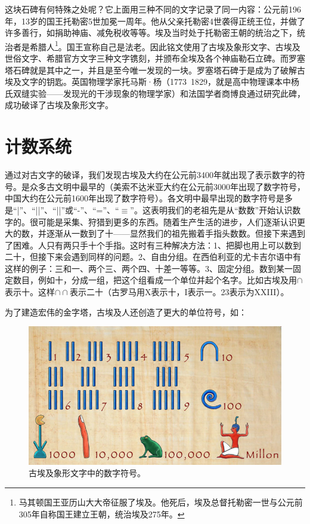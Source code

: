 \documentclass[b5paper]{ctexart}
\begin{document}
这块石碑有何特殊之处呢？它上面用三种不同的文字记录了同一内容：公元前196年，13岁的国王托勒密5世加冕一周年。他从父亲托勒密4世袭得正统王位，并做了许多善行，如捐助神庙、减免税收等等。埃及当时处于托勒密王朝的统治之下，统治者是希腊人\footnote{马其顿国王亚历山大大帝征服了埃及。他死后，埃及总督托勒密一世与公元前305年自称国王建立王朝，统治埃及275年。}。国王宣称自己是法老。因此铭文使用了古埃及象形文字、古埃及世俗文字、希腊官方文字三种文字镌刻，并颁布全埃及各个神庙勒石立碑。而罗塞塔石碑就是其中之一，并且是至今唯一发现的一块。罗塞塔石碑于是成为了破解古埃及文字的钥匙。英国物理学家托马斯·杨（1773~1829，就是高中物理课本中杨氏双缝实验——发现光的干涉现象的物理学家）和法国学者商博良通过研究此碑，成功破译了古埃及象形文字。

\section{计数系统}

通过对古文字的破译，我们发现古埃及大约在公元前3400年就出现了表示数字的符号。是众多古文明中最早的（美索不达米亚大约在公元前3000年出现了数字符号，中国大约在公元前1600年出现了数字符号）。各文明中最早出现的数字符号是多是“|”、“||”、“||”或“-”、“=”、“$\equiv$”。这表明我们的老祖先是从“数数”开始认识数字的。很可能是采集、狩猎到更多的东西。随着生产生活的进步，人们逐渐认识更大的数，并逐渐从一数到了十——显然我们的祖先搬着手指头数数。但接下来遇到了困难。人只有两只手十个手指。这时有三种解决方法：1、把脚也用上可以数到二十，但接下来会遇到同样的问题。2、自由分组。在西伯利亚的尤卡吉尔语中有这样的例子：三和一、两个三、两个四、十差一等等。3、固定分组。数到某一固定数目，例如十，分成一组，把这个组看成一个单位并起个名字。比如古埃及用$\cap$表示十。这样$\cap \cap$表示二十（古罗马用X表示十，I表示一。23表示为XXIII）。

为了建造宏伟的金字塔，古埃及人还创造了更大的单位符号，如：

\begin{figure}[htbp]
 \centering
 \includegraphics[scale=0.8]{img/hieroglyphic-numbers}
 \caption{古埃及象形文字中的数字符号。}
 \label{fig:rosetta-stone-recons}
\end{figure}
\end{document}
